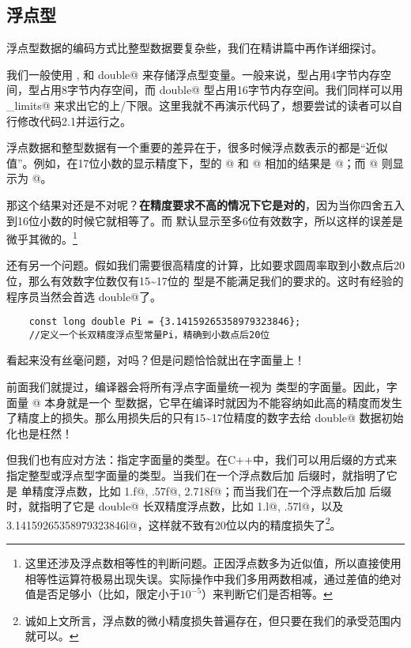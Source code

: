 \subsection*{浮点型}
浮点型数据的编码方式比整型数据要复杂些，我们在精讲篇中再作详细探讨。\par
我们一般使用 \lstinline@float@, \lstinline@double@ 和 \lstinline@long double@ 来存储浮点型变量。一般来说，\lstinline@float@ 型占用4字节内存空间，\lstinline@double@ 型占用8字节内存空间，而 \lstinline@long double@ 型占用16字节内存空间。我们同样可以用 \lstinline@numeric_limits@ 来求出它的上/下限。这里我就不再演示代码了，想要尝试的读者可以自行修改代码2.1并运行之。\par
浮点数据和整型数据有一个重要的差异在于，很多时候浮点数表示的都是``近似值''。例如，在17位小数的显示精度下，\lstinline@double@ 型的 @ 和 @ 相加的结果是 @；而 @ 则显示为 @。\par
那这个结果对还是不对呢？\textbf{在精度要求不高的情况下它是对的}，因为当你四舍五入到16位小数的时候它就相等了。而 \lstinline@cout@ 默认显示至多6位有效数字，所以这样的误差是微乎其微的。\footnote{这里还涉及浮点数相等性的判断问题。正因浮点数多为近似值，所以直接使用相等性运算符极易出现失误。实际操作中我们多用两数相减，通过差值的绝对值是否足够小（比如，限定小于$10^{-5}$）来判断它们是否相等。}\par
还有另一个问题。假如我们需要很高精度的计算，比如要求圆周率取到小数点后20位，那么有效数字位数仅有15\~{}17位的 \lstinline@double@ 型是不能满足我们的要求的。这时有经验的程序员当然会首选 \lstinline@long double@了。
\begin{lstlisting}
    const long double Pi = {3.14159265358979323846};
    //定义一个长双精度浮点型常量Pi，精确到小数点后20位
\end{lstlisting}
看起来没有丝毫问题，对吗？但是问题恰恰就出在字面量上！\par
前面我们就提过，编译器会将所有浮点字面量统一视为 \lstinline@double@ 类型的字面量。因此，字面量 @ 本身就是一个 \lstinline@double@ 型数据，它早在编译时就因为不能容纳如此高的精度而发生了精度上的损失。那么用损失后的只有15\~{}17位精度的数字去给 \lstinline@long double@ 数据初始化也是枉然！\par
但我们也有应对方法：指定字面量的类型。在C++中，我们可以用后缀的方式来指定整型或浮点型字面量的类型。当我们在一个浮点数后加 \lstinline@f@ 后缀时，就指明了它是 \lstinline@float@ 单精度浮点数，比如 \lstinline@1.f@, \lstinline@.57f@, \lstinline@2.718f@；而当我们在一个浮点数后加 \lstinline@l@ 后缀时，就指明了它是 \lstinline@long double@ 长双精度浮点数，比如 \lstinline@1.l@, \lstinline@.57l@，以及 \lstinline@3.14159265358979323846l@，这样就不致有20位以内的精度损失了\footnote{诚如上文所言，浮点数的微小精度损失普遍存在，但只要在我们的承受范围内就可以。}。\par
